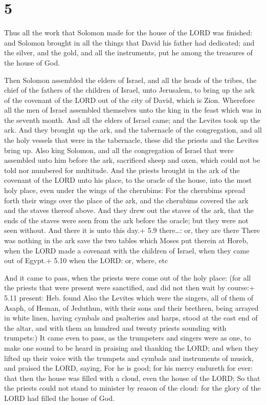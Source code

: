 \hypertarget{section-4}{%
\section{5}\label{section-4}}

 Thus all the work that Solomon made for the house of the
LORD was finished: and Solomon brought in all the things that David his
father had dedicated; and the silver, and the gold, and all the
instruments, put he among the treasures of the house of God.

 Then Solomon assembled the elders of Israel, and all the
heads of the tribes, the chief of the fathers of the children of Israel,
unto Jerusalem, to bring up the ark of the covenant of the LORD out of
the city of David, which is Zion.  Wherefore all the men of
Israel assembled themselves unto the king in the feast which was in the
seventh month.  And all the elders of Israel came; and the
Levites took up the ark.  And they brought up the ark, and
the tabernacle of the congregation, and all the holy vessels that were
in the tabernacle, these did the priests and the Levites bring up.
 Also king Solomon, and all the congregation of Israel that
were assembled unto him before the ark, sacrificed sheep and oxen, which
could not be told nor numbered for multitude.  And the
priests brought in the ark of the covenant of the LORD unto his place,
to the oracle of the house, into the most holy place, even under the
wings of the cherubims:  For the cherubims spread forth
their wings over the place of the ark, and the cherubims covered the ark
and the staves thereof above.  And they drew out the staves
of the ark, that the ends of the staves were seen from the ark before
the oracle; but they were not seen without. And there it is unto this
day.+ 5.9 there\ldots: or, they are there  There was
nothing in the ark save the two tables which Moses put therein at Horeb,
when the LORD made a covenant with the children of Israel, when they
came out of Egypt.+ 5.10 when the LORD: or, where, etc

 And it came to pass, when the priests were come out of
the holy place: (for all the priests that were present were sanctified,
and did not then wait by course:+ 5.11 present: Heb. found 
Also the Levites which were the singers, all of them of Asaph, of Heman,
of Jeduthun, with their sons and their brethren, being arrayed in white
linen, having cymbals and psalteries and harps, stood at the east end of
the altar, and with them an hundred and twenty priests sounding with
trumpets:)  It came even to pass, as the trumpeters and
singers were as one, to make one sound to be heard in praising and
thanking the LORD; and when they lifted up their voice with the trumpets
and cymbals and instruments of musick, and praised the LORD, saying, For
he is good; for his mercy endureth for ever: that then the house was
filled with a cloud, even the house of the LORD;  So that
the priests could not stand to minister by reason of the cloud: for the
glory of the LORD had filled the house of God.

